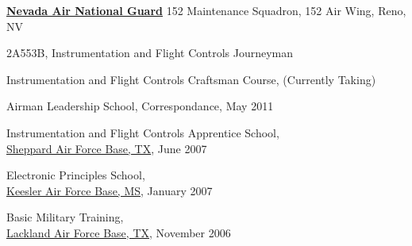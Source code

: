 \documentclass[10pt]{article}
\newenvironment{outerlist}[1][\enskip\textbullet]%
        {\begin{itemize}[#1]}{\end{itemize}%
         \vspace{-.6\baselineskip}}
\newenvironment{innerlist}[1][\enskip\textbullet]%
        {\begin{compactitem}[#1]}{\end{compactitem}}
\begin{document}
\href{http://www.af.mil/}{\textbf{Nevada Air National Guard}}
152 Maintenance Squadron, 152 Air Wing, Reno, NV
\begin{outerlist}
\item[] 2A553B, {Instrumentation and Flight Controls Journeyman}
        \begin{innerlist}
        \item Instrumentation and Flight Controls Craftsman Course, (Currently Taking)
        \item Airman Leadership School, Correspondance, May 2011
        \item Instrumentation and Flight Controls Apprentice School,\\
        \href{http://www.sheppard.af.mil/}
             {Sheppard Air Force Base, TX}, June 2007
        \item Electronic Principles School,\\
        \href{http://www.keesler.af.mil/}
             {Keesler Air Force Base, MS}, January 2007
        \item Basic Military Training,\\
        \href{http://www.lackland.af.mil/}
             {Lackland Air Force Base, TX}, November 2006\\
        \end{innerlist}
\end{outerlist}
\end{document}
